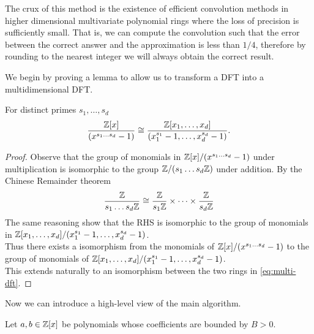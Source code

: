 
The crux of this method is the existence of efficient convolution methods in higher dimensional multivariate polynomial rings where the loss of precision is sufficiently small. That is, we can compute the convolution such that the error between the correct answer and the approximation is less than $1 / 4$, therefore by rounding to the nearest integer we will always obtain the correct result.

We begin by proving a lemma to allow us to transform a DFT into a multidimensional DFT.

\begin{lemma}
    For distinct primes $s_1, \ldots, s_d$
    \begin{equation}\label{eq:multi-dft}
        \frac{{\mathbb Z}[x]}{(x^{s_1\ldots s_d} - 1)} \cong \frac{{\mathbb Z}[x_1, \ldots, x_d]}{(x_1^{s_1} - 1, \ldots, x_d^{s_d} - 1)}.
    \end{equation}
\end{lemma}

\begin{proof}
    Observe that the group of monomials in ${\mathbb Z}[x]/(x^{s_1\ldots s_d} - 1)$ under multiplication is isomorphic to the group ${\mathbb Z}/(s_1 \ldots s_d{\mathbb Z})$ under addition. By the Chinese Remainder theorem
    \[
        \frac{{\mathbb Z}}{s_1\ldots s_d {\mathbb Z}} \cong \frac{{\mathbb Z}}{s_1 {\mathbb Z}} \times \cdots \times \frac{{\mathbb Z}}{s_d {\mathbb Z}}
    \]
    The same reasoning show that the RHS is isomorphic to the group of monomials in ${\mathbb Z}[x_1, \ldots, x_d]/(x_1^{s_1} - 1, \ldots, x_d^{s_d} - 1)$.\\
    Thus there exists a isomorphism from the monomials of ${\mathbb Z}[x]/(x^{s_1\ldots s_d} - 1)$ to the group of monomials of ${\mathbb Z}[x_1, \ldots, x_d]/(x_1^{s_1} - 1, \ldots, x_d^{s_d} - 1)$.\\
    This extends naturally to an isomorphism between the two rings in \eqref{eq:multi-dft}.
\end{proof}

Now we can introduce a high-level view of the main algorithm.

Let $a, b \in {\mathbb Z}[x]$ be polynomials whose coefficients are bounded by $B > 0$.

